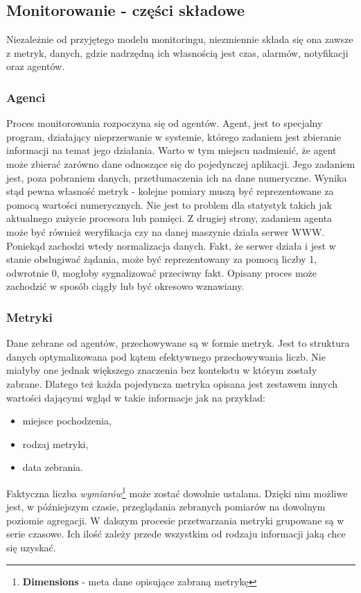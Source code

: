     \subsection{Monitorowanie - części składowe}
    Niezależnie od przyjętego modelu monitoringu, niezmiennie składa się ona zawsze z metryk, danych, gdzie nadrzędną 
    ich własnością jest czas, alarmów, notyfikacji oraz agentów.
    
        \subsubsection{Agenci}
        Proces monitorowania rozpoczyna się od agentów. Agent, jest to specjalny program, działający nieprzerwanie w systemie, którego
        zadaniem jest zbieranie informacji na temat jego działania. Warto w tym miejscu nadmienić, że agent może zbierać zarówno
        dane odnoszące się do pojedynczej aplikacji. Jego zadaniem jest, poza pobraniem danych, przetłumaczenia ich na dane 
        numeryczne. Wynika stąd pewna własność metryk - kolejne pomiary muszą być reprezentowane za pomocą wartości numerycznych.
        Nie jest to problem dla statystyk takich jak aktualnego zużycie procesora lub pamięci. Z drugiej strony, zadaniem agenta
        może być również weryfikacja czy na danej maszynie działa serwer WWW. Poniekąd zachodzi wtedy normalizacja danych. Fakt, że
        serwer działa i jest w stanie obsługiwać żądania, może być reprezentowany za pomocą liczby 1, odwrotnie 0, mogłoby sygnalizować
        przeciwny fakt. Opisany proces może zachodzić w sposób ciągły lub być okresowo wznawiany.
        
        \subsubsection{Metryki}
        Dane zebrane od agentów, przechowywane są w formie metryk. Jest to struktura danych optymalizowana pod kątem
        efektywnego przechowywania liczb. Nie miałyby one jednak większego znaczenia bez kontekstu w którym zostały
        zabrane. Dlatego też każda pojedyncza metryka opisana jest zestawem innych wartości dającymi wgląd w takie
        informacje jak na przykład:
        \begin{itemize}
            \item miejsce pochodzenia,
            \item rodzaj metryki,
            \item data zebrania.
        \end{itemize}
        Faktyczna liczba \textit{wymiarów}\footnote{\textbf{Dimensions} - meta dane opisujące zabraną metrykę} może
        zostać dowolnie ustalana. Dzięki nim możliwe jest, w późniejszym czasie, przeglądania zebranych pomiarów
        na dowolnym poziomie agregacji. W dalszym procesie przetwarzania metryki grupowane są w serie czasowe. Ich ilość
        zależy przede wszystkim od rodzaju informacji jaką chce się uzyskać.
        
